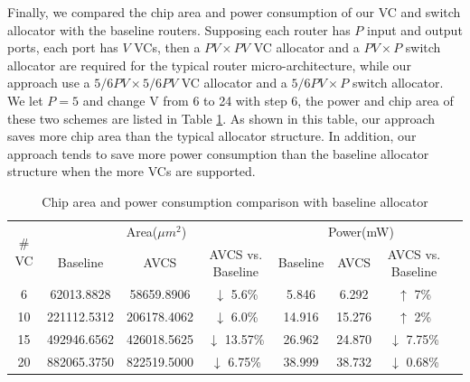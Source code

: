 \documentclass[10pt,conference]{IEEEtran}
\begin{document}
Finally, we compared the chip area and power consumption of our VC and switch allocator with the baseline routers. Supposing each router has $P$ input and output ports, each port has $V$ VCs, then a $PV\times PV$ VC allocator and a $PV\times P$ switch allocator are required for the typical router micro-architecture, while our approach use a $5/6PV\times 5/6PV$ VC allocator and a $5/6PV\times P$ switch allocator. We let $P=5$ and change V from 6 to 24 with step 6, the power and chip area of these two schemes are listed in Table \ref{alloccost}. As shown in this table, our approach saves more chip area than the typical allocator structure. In addition, our approach tends to save more power consumption than the baseline allocator structure when the more VCs are supported.

\begin{table}
\centering\begin{tabular}{|c|c|c|c|c|c|c|c|}
\hline
\multirow{2}{*}{$\#$VC} & \multicolumn{3}{|c|}{Area($\mu m^2$)} & \multicolumn{3}{|c|}{Power(mW)}\\
\cline{2-7}
& Baseline & AVCS & AVCS vs. Baseline & Baseline & AVCS & AVCS vs. Baseline\\
\hline
6 & 62013.8828 & 58659.8906 & $\downarrow$ 5.6\% & 5.846 & 6.292 & $\uparrow$ 7\%\\
\hline
10 & 221112.5312 & 206178.4062 & $\downarrow$ 6.0\% & 14.916 & 15.276 & $\uparrow$ 2\%\\
\hline
15 & 492946.6562 & 426018.5625 & $\downarrow$ 13.57\% & 26.962 & 24.870 & $\downarrow$ 7.75\%\\
\hline
20 & 882065.3750 & 822519.5000 & $\downarrow$ 6.75\% & 38.999 & 38.732 & $\downarrow$ 0.68\%\\
\hline
\end{tabular}
\caption{Chip area and power consumption comparison with baseline allocator}\label{alloccost}
\end{table}
\end{document}
